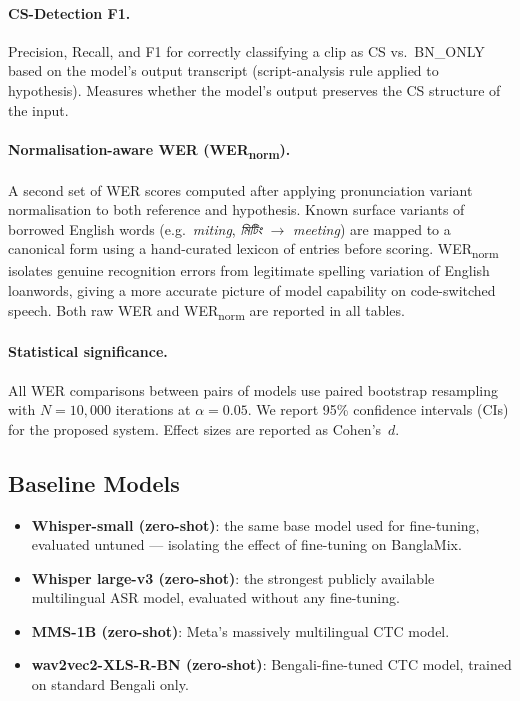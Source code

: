 \paragraph{CS-Detection F1.}
Precision, Recall, and F1 for correctly classifying a clip as CS vs.\ BN\_ONLY
based on the model's output transcript (script-analysis rule applied to
hypothesis).
Measures whether the model's output preserves the CS structure of the input.

\paragraph{Normalisation-aware WER (WER\textsubscript{norm}).}
A second set of WER scores computed after applying pronunciation variant
normalisation to both reference and hypothesis.
Known surface variants of borrowed English words (e.g.\ \textit{miting},
\textit{মিটিং} $\to$ \textit{meeting}) are mapped to a canonical form using
a hand-curated lexicon of  entries before scoring.
WER\textsubscript{norm} isolates genuine recognition errors from legitimate
spelling variation of English loanwords, giving a more accurate picture of
model capability on code-switched speech.
Both raw WER and WER\textsubscript{norm} are reported in all tables.

\paragraph{Statistical significance.}
All WER comparisons between pairs of models use paired bootstrap resampling
\citep{berg2012empirical} with $N=10{,}000$ iterations at $\alpha=0.05$.
We report 95\% confidence intervals (CIs) for the proposed system.
Effect sizes are reported as Cohen's~$d$.

\subsection{Baseline Models}

\begin{itemize}[leftmargin=*, itemsep=2pt]
  \item \textbf{Whisper-small (zero-shot)}: the same base model used for
        fine-tuning, evaluated untuned --- isolating the effect of fine-tuning
        on BanglaMix.
  \item \textbf{Whisper large-v3 (zero-shot)}: the strongest publicly available
        multilingual ASR model, evaluated without any fine-tuning.
  \item \textbf{MMS-1B (zero-shot)}: Meta's massively multilingual CTC model.
  \item \textbf{wav2vec2-XLS-R-BN (zero-shot)}: Bengali-fine-tuned CTC model,
        trained on standard Bengali only.
\end{itemize}

